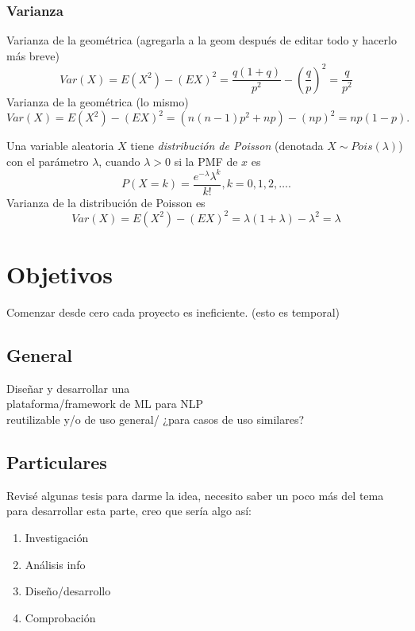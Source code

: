 \documentclass[letterpaper]{article}
\begin{document}
\subsubsection{Varianza}
Varianza de la geométrica (agregarla a la geom después de editar todo y hacerlo más breve)
\begin{equation}
Var(X)=E(X^2)-{(EX)}^2=\frac{q(1+q)}{p^2}-{(\frac{q}{p})}^2=\frac{q}{p^2}
\end{equation}
Varianza de la geométrica (lo mismo)
\begin{equation}
Var(X)=E(X^2)-{(EX)}^2=(n(n-1)p^2+np)-(np)^2=np(1-p).
\end{equation}

Una variable aleatoria $X$ tiene \emph{distribución de Poisson} (denotada $X\sim Pois(\lambda)$) con el parámetro $\lambda$, cuando $\lambda > 0$ si la PMF de $x$ es
\begin{equation}
P(X=k)=\frac{e^{-\lambda}\lambda^k}{k!}, k=0,1,2,\ldots.
\end{equation}
Varianza de la distribución de Poisson es
\begin{equation}
Var(X)=E(X^2)-{(EX)}^2=\lambda(1+\lambda)-\lambda^2=\lambda
\end{equation}
\section {Objetivos}
Comenzar desde cero cada proyecto es ineficiente. (esto es temporal)
\subsection {General}
Diseñar y desarrollar una\\
plataforma/framework de ML para NLP\\
reutilizable y/o de uso general/ ¿para casos de uso similares?
\subsection {Particulares}
Revisé algunas tesis para darme la idea, necesito saber un poco más del tema para desarrollar esta parte, creo que sería algo así:
\begin{enumerate}
    \item Investigación
    \item Análisis info
    \item Diseño/desarrollo
    \item Comprobación
\end{enumerate}
\end{document}
